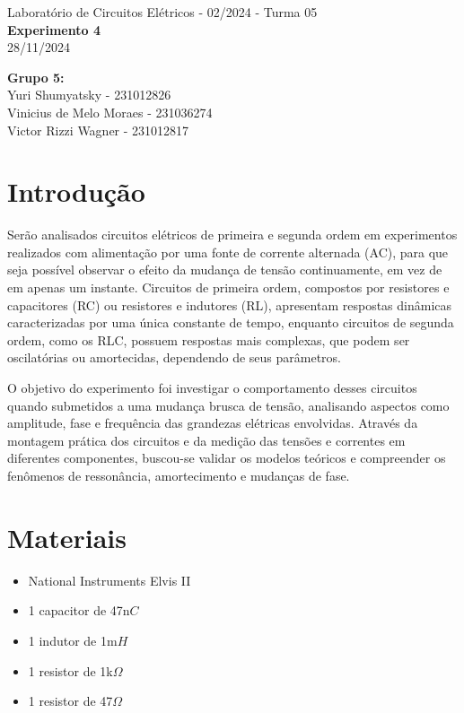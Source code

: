 \documentclass[a4 paper]{article}
\newcommand{\parag}{\hspace{30pt}}
\begin{document}
\justifying
\begin{center}{\large Laboratório de Circuitos Elétricos - 02/2024 - Turma 05}\\
{\large \textbf{Experimento 4}}\\ 
28/11/2024
\end{center}

\vspace{500pt}
 \noindent\textbf{Grupo 5:}\\
 Yuri Shumyatsky - 231012826\\
Vinicius de Melo Moraes - 231036274\\
Victor Rizzi Wagner - 231012817


\vspace{30pt}
\newpage

\section{Introdução}

\parag Serão analisados circuitos elétricos de primeira e segunda ordem em experimentos realizados com alimentação por uma fonte de corrente alternada (AC), para que seja possível observar o efeito da mudança de tensão continuamente, em vez de em apenas um instante. Circuitos de primeira ordem, compostos por resistores e capacitores (RC) ou resistores e indutores (RL), apresentam respostas dinâmicas caracterizadas por uma única constante de tempo, enquanto circuitos de segunda ordem, como os RLC, possuem respostas mais complexas, que podem ser oscilatórias ou amortecidas, dependendo de seus parâmetros.

O objetivo do experimento foi investigar o comportamento desses circuitos quando submetidos a uma mudança brusca de tensão, analisando aspectos como amplitude, fase e frequência das grandezas elétricas envolvidas. Através da montagem prática dos circuitos e da medição das tensões e correntes em diferentes componentes, buscou-se validar os modelos teóricos e compreender os fenômenos de ressonância, amortecimento e mudanças de fase.

\vspace{70pt}
\section{Materiais}

	\begin{itemize}
	\item National Instruments Elvis II
	\item 1 capacitor de 47n$C$
	\item 1 indutor de 1m$H$
	\item 1 resistor de 1k$\Omega$
	\item 1 resistor de 47$\Omega$
	\end{itemize}
\end{document}
